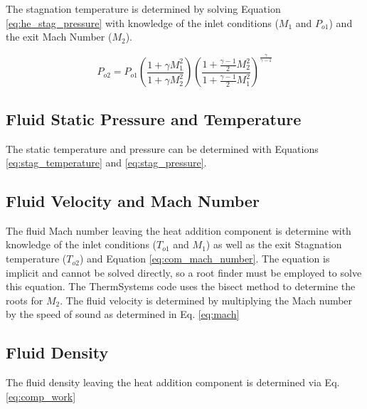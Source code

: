 The stagnation temperature is determined by solving Equation \ref{eq:he_stag_pressure} with knowledge of the inlet conditions 
($M_1$ and $P_{o1}$) and the exit Mach Number ($M_2$).

\begin{equation}
\label{eq:he_stag_pressure}
P_{o2} = P_{o1}\left(\frac{1 + \gamma M^2_1}{1 + \gamma M^2_2} \right) \left(\frac{1 + \frac{\gamma - 1}{2}M^2_2}{1 + \frac{\gamma -1}{2}M^2_1} \right)^{\frac{\gamma}{\gamma - 1}}
\end{equation}

\subsection{Fluid Static Pressure and Temperature}
The static temperature and pressure can be determined with Equations \ref{eq:stag_temperature} and \ref{eq:stag_pressure}.

\subsection{Fluid Velocity and Mach Number}
The fluid Mach number leaving the heat addition component is determine with knowledge of the inlet conditions ($T_{o1}$ and $M_1$) as
well as the exit Stagnation temperature ($T_{o2}$) and Equation \ref{eq:com_mach_number}.  The equation is implicit and cannot be solved
directly, so a root finder must be employed to solve this equation.  The ThermSystems code uses the bisect method to determine the roots
for $M_2$.  The fluid velocity is determined by multiplying the Mach number by the speed of sound as determined in Eq. \ref{eq:mach}

\subsection{Fluid Density}
The fluid density leaving the heat addition component is determined via Eq. \ref{eq:comp_work}

